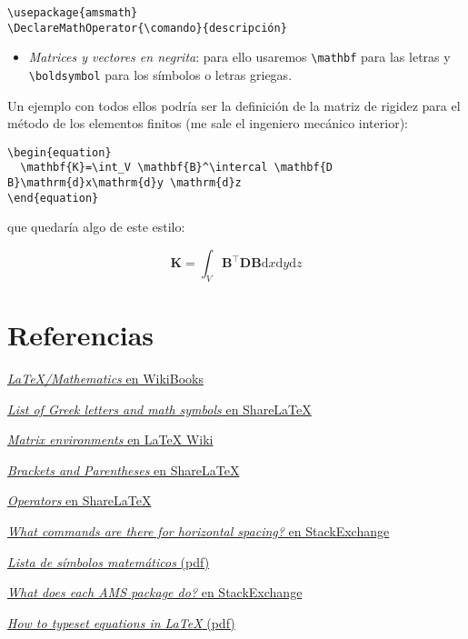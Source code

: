 \begin{lstlisting}[language={[latex]tex}]
\usepackage{amsmath}
\DeclareMathOperator{\comando}{descripción}
\end{lstlisting}

\begin{itemize}
\item
  \emph{Matrices y vectores en negrita}: para ello usaremos
  \lstinline!\mathbf! para las letras y \lstinline!\boldsymbol! para los
  símbolos o letras griegas.
\end{itemize}

Un ejemplo con todos ellos podría ser la definición de la matriz de
rigidez para el método de los elementos finitos (me sale el ingeniero
mecánico interior):

\begin{lstlisting}[language={[latex]tex}]
\begin{equation}
  \mathbf{K}=\int_V \mathbf{B}^\intercal \mathbf{D B}\mathrm{d}x\mathrm{d}y \mathrm{d}z
\end{equation}
\end{lstlisting}

que quedaría algo de este estilo:

\begin{equation*}
  \mathbf{K}=\int_V \mathbf{B}^\intercal\mathbf{D B}\mathrm{d}x \mathrm{d}y \mathrm{d}z
\end{equation*}

\section{Referencias}\label{sec:referencias}

\href{https://en.wikibooks.org/wiki/LaTeX/Mathematics}{\emph{LaTeX/Mathematics}
en WikiBooks}

\href{https://www.sharelatex.com/learn/List_of_Greek_letters_and_math_symbols}{\emph{List
of Greek letters and math symbols} en ShareLaTeX}

\href{http://latex.wikia.com/wiki/Matrix_environments}{\emph{Matrix
environments} en LaTeX Wiki}

\href{https://www.sharelatex.com/learn/Brackets_and_Parentheses}{\emph{Brackets
and Parentheses} en ShareLaTeX}

\href{https://www.sharelatex.com/learn/Operators}{\emph{Operators} en
ShareLaTeX}

\href{http://tex.stackexchange.com/questions/74353/what-commands-are-there-for-horizontal-spacing\#74354*}{\emph{What
commands are there for horizontal spacing?} en StackExchange}

\href{http://www.colorado.edu/physics/phys4610/phys4610_sp15/PHYS4610_sp15/Home_files/LaTeXSymbols.pdf}{\emph{Lista
de símbolos matemáticos} (pdf)}

\href{http://tex.stackexchange.com/questions/32100/what-does-each-ams-package-do}{\emph{What
does each AMS package do?} en StackExchange}

\href{http://moser-isi.ethz.ch/docs/typeset_equations.pdf}{\emph{How to
typeset equations in LaTeX} (pdf)}
